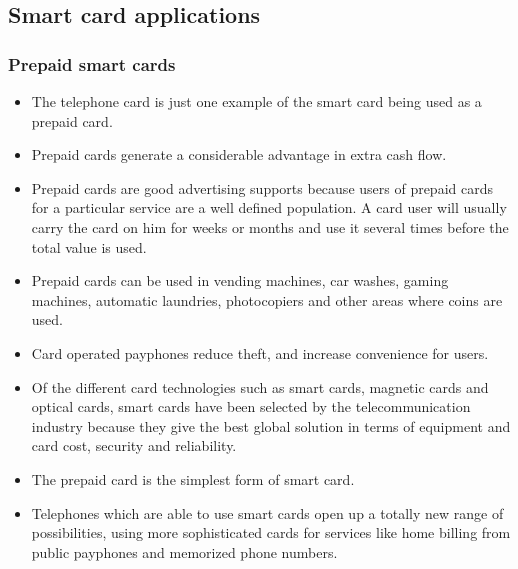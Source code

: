 \subsection{Smart card applications}

\subsubsection{Prepaid smart cards}

\begin{htmllist}

    
  \begin{itemize}
    \item The telephone card is just one example of the smart card being
      used as a prepaid card.
    \item Prepaid cards generate a considerable advantage in extra cash flow.
    \item Prepaid cards are good advertising supports because users of
      prepaid cards for a particular service are a well defined population. A
      card user will usually carry the card on him for weeks or months and
      use it several times before the total value is used.
    \item Prepaid cards can be used in vending machines, car washes, gaming
      machines, automatic laundries, photocopiers and other areas where coins
      are used.
    \item Card operated payphones reduce theft, and increase convenience for
      users.
    \item Of the different card technologies such as smart cards, magnetic
      cards and optical cards, smart cards have been selected by the
      telecommunication industry because they give the best global solution
      in terms of equipment and card cost, security and reliability.
    \item The prepaid card is the simplest form of smart card.
    \item Telephones which are able to use smart cards open up a totally new
      range of possibilities, using more sophisticated cards for services
      like home billing from public payphones and memorized phone numbers.
  \end{itemize}


\end{htmllist}

